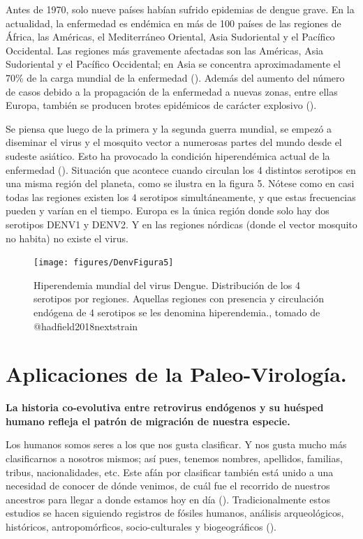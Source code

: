\documentclass[
  12pt, krantz2,
  spanish,
]{krantz}
\begin{document}
\hfill\break
Antes de 1970, solo nueve países habían sufrido epidemias de dengue grave. En la actualidad, la enfermedad es endémica en más de 100 países de las regiones de África, las Américas, el Mediterráneo Oriental, Asia Sudoriental y el Pacífico Occidental. Las regiones más gravemente afectadas son las Américas, Asia Sudoriental y el Pacífico Occidental; en Asia se concentra aproximadamente el 70\% de la carga mundial de la enfermedad (\citet{whodenv}). Además del aumento del número de casos debido a la propagación de la enfermedad a nuevas zonas, entre ellas Europa, también se producen brotes epidémicos de carácter explosivo (\citet{hadfield2018nextstrain}).

Se piensa que luego de la primera y la segunda guerra mundial, se empezó a diseminar el virus y el mosquito vector a numerosas partes del mundo desde el sudeste asiático. Esto ha provocado la condición hiperendémica actual de la enfermedad (\citet{hadfield2018nextstrain}). Situación que acontece cuando circulan los 4 distintos serotipos en una misma región del planeta, como se ilustra en la figura 5. Nótese como en casi todas las regiones existen los 4 serotipos simultáneamente, y que estas frecuencias pueden y varían en el tiempo. Europa es la única región donde solo hay dos serotipos DENV1 y DENV2. Y en las regiones nórdicas (donde el vector mosquito no habita) no existe el virus.

\begin{figure}
\texttt{[image: figures/DenvFigura5]} \caption{Hiperendemia mundial del virus Dengue. Distribución de los 4 serotipos por regiones. Aquellas regiones con presencia y circulación endógena de 4 serotipos se les denomina hiperendemia., tomado de @hadfield2018nextstrain}\label{fig:DenvHyper}
\end{figure}

\hypertarget{paleovir}{%
\section{Aplicaciones de la Paleo-Virología.}\label{paleovir}}

\textbf{La historia co-evolutiva entre retrovirus endógenos y su huésped humano refleja el patrón de migración de nuestra especie.}

Los humanos somos seres a los que nos gusta clasificar. Y nos gusta mucho más clasificarnos a nosotros mismos; así pues, tenemos nombres, apellidos, familias, tribus, nacionalidades, etc. Este afán por clasificar también está unido a una necesidad de conocer de dónde venimos, de cuál fue el recorrido de nuestros ancestros para llegar a donde estamos hoy en día (\citet{terrell1977biology}). Tradicionalmente estos estudios se hacen siguiendo registros de fósiles humanos, análisis arqueológicos, históricos, antropomórficos, socio-culturales y biogeográficos (\citet{terrell1977biology}).
\end{document}
